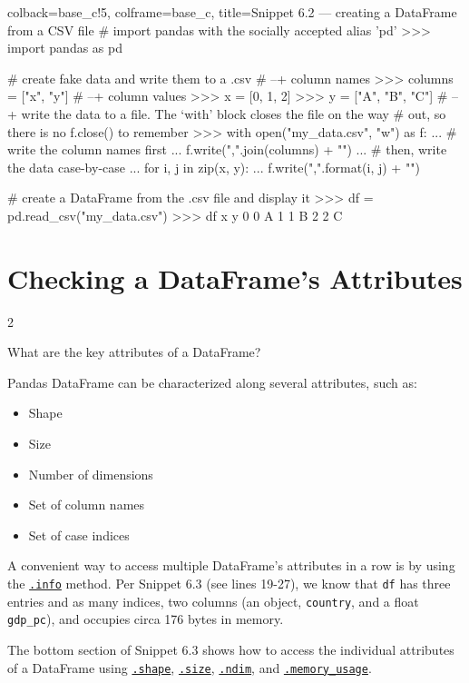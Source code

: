 \documentclass[a4paper,11pt]{book}
\newcommand{\question}[1]{%
    \begin{tcolorbox}[colback=comp_c!10,colframe=comp_c,sidebyside align=top,width=\linewidth,before skip=1ex]
        #1
    \end{tcolorbox}
    \switchcolumn%
}
\newcommand{\note}[1]{%
    \begin{tcolorbox}[colback=white!0,colframe=white!10,width=\linewidth,before skip=1ex]
        #1
    \end{tcolorbox}
}
\begin{document}
\begin{pythoncode}[linenos=True]{colback=base_c!5, colframe=base_c, title=\sffamily Snippet 6.2 --- creating a DataFrame from a CSV file}
# import pandas with the socially accepted alias 'pd'
>>> import pandas as pd

# create fake data and write them to a .csv
# --+ column names
>>> columns = ["x", "y"]
# --+ column values
>>> x = [0, 1, 2]
>>> y = ["A", "B", "C"]
# --+ write the data to a file. The `with' block closes the file on the way
#     out, so there is no f.close() to remember
>>> with open("my_data.csv", "w") as f:
...     # write the column names first
...     f.write(",".join(columns) + "\n")
...     # then, write the data case-by-case
...     for i, j in zip(x, y):
...         f.write("{},{}".format(i, j) + "\n")

# create a DataFrame from the .csv file and display it
>>> df = pd.read_csv("my_data.csv")
>>> df
   x  y
0  0  A
1  1  B
2  2  C
\end{pythoncode}

\section{Checking a DataFrame's Attributes}
\label{sec:df_attrs}
\begin{paracol}{2}
	\question{\raggedright What are the key attributes of a DataFrame?}
	\note{Pandas DataFrame can be characterized along several attributes, such as:
	\begin{itemize}
		\item Shape 
		\item Size 
		\item Number of dimensions 
		\item Set of column names
		\item Set of case indices 
	\end{itemize}

	\quad A convenient way to access multiple DataFrame's attributes in a row is by using the \href{https://pandas.pydata.org/docs/reference/api/pandas.DataFrame.info.html}{\texttt{.info}} method. Per Snippet 6.3 (see lines 19-27), we know that \texttt{df} has three entries and as many indices, two columns (an object, \texttt{country}, and a float \texttt{gdp\_pc}), and occupies circa 176 bytes in memory.

	\quad The bottom section of Snippet 6.3 shows how to access the individual attributes of a DataFrame using \href{https://pandas.pydata.org/docs/reference/api/pandas.DataFrame.shape.html}{\texttt{.shape}}, \href{https://pandas.pydata.org/docs/reference/api/pandas.DataFrame.size.html}{\texttt{.size}}, \href{https://pandas.pydata.org/docs/reference/api/pandas.DataFrame.ndim.html}{\texttt{.ndim}}, and \href{https://pandas.pydata.org/docs/reference/api/pandas.DataFrame.memory_usage.html}{\texttt{.memory\_usage}}.}
\end{paracol}
\end{document}
